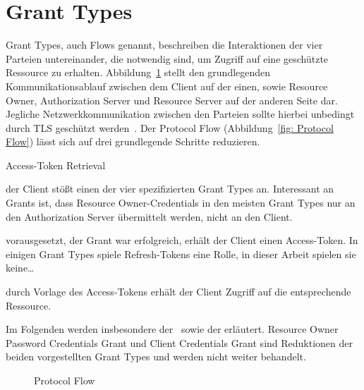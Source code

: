 \section{\glspl{Grant Type}}\label{GrantTypes} \glspl{Grant Type}, auch Flows
genannt, beschreiben die Interaktionen der vier Parteien untereinander, die
notwendig sind, um Zugriff auf eine geschützte Ressource zu erhalten.
Abbildung~\ref{fig: Protocol Flow} stellt den grundlegenden Kommunikationsablauf
zwischen dem Client auf der einen, sowie Resource Owner, Authorization Server
und Resource Server auf der anderen Seite dar. Jegliche Netzwerkkommunikation
zwischen den Parteien sollte hierbei unbedingt durch TLS geschützt
werden~. Der Protocol Flow (Abbildung~\ref{fig:
Protocol Flow}) lässt sich auf drei grundlegende Schritte reduzieren.

\begin{labeling}{Access-Token Retrieval}
    \item [Authorization Grant] der Client stößt einen der vier spezifizierten
    \glspl{Grant Type} an. Interessant an Grants ist, dass Resource
    Owner-Credentials in den meisten \glspl{Grant Type} nur an den
    Authorization Server übermittelt werden, nicht an den Client.
    \item [Access-Token Retrieval] vorausgesetzt, der Grant war erfolgreich,
    erhält der Client einen Access-Token. In einigen \glspl{Grant Type} spiele
    Refresh-Tokens eine Rolle, in dieser Arbeit spielen sie keine\ldots
    \item [Resource Access] durch Vorlage des Access-Tokens erhält der Client
    Zugriff auf die entsprechende Ressource.
\end{labeling} Im Folgenden werden insbesondere der~
sowie der  erläutert. Resource Owner Password
Credentials Grant und Client Credentials Grant sind Reduktionen der beiden
vorgestellten \glspl{Grant Type} und werden nicht weiter behandelt.

\begin{figure}[h]
    \scalebox{.5} {
        
    }
    \caption{Protocol Flow~\protect{}}\label{fig: Protocol Flow}
\end{figure} \noindent
